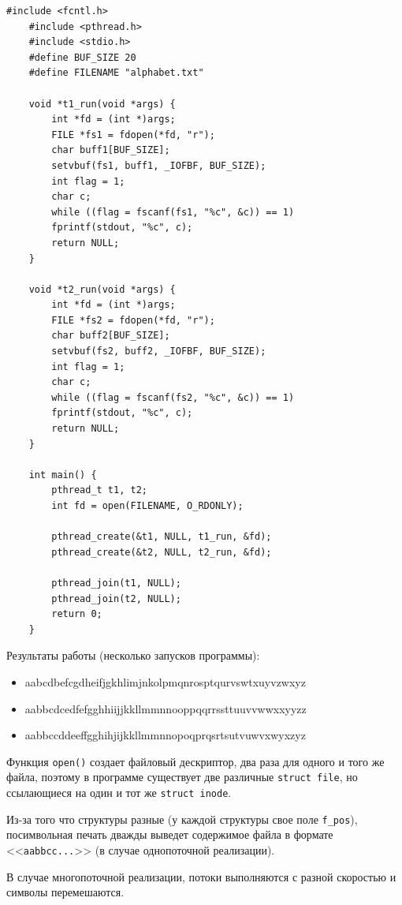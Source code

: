 \begin{lstlisting}[caption={\text{Программа №2 (многопоточная)}}]
	#include <fcntl.h>
	#include <pthread.h>
	#include <stdio.h>
	#define BUF_SIZE 20
	#define FILENAME "alphabet.txt"
	
	void *t1_run(void *args) {
		int *fd = (int *)args;
		FILE *fs1 = fdopen(*fd, "r");
		char buff1[BUF_SIZE];
		setvbuf(fs1, buff1, _IOFBF, BUF_SIZE);
		int flag = 1;
		char c;
		while ((flag = fscanf(fs1, "%c", &c)) == 1)
		fprintf(stdout, "%c", c);
		return NULL;
	}
	
	void *t2_run(void *args) {
		int *fd = (int *)args;
		FILE *fs2 = fdopen(*fd, "r");
		char buff2[BUF_SIZE];
		setvbuf(fs2, buff2, _IOFBF, BUF_SIZE);
		int flag = 1;
		char c;
		while ((flag = fscanf(fs2, "%c", &c)) == 1)
		fprintf(stdout, "%c", c);
		return NULL;
	}
	
	int main() {
		pthread_t t1, t2;
		int fd = open(FILENAME, O_RDONLY);
		
		pthread_create(&t1, NULL, t1_run, &fd);
		pthread_create(&t2, NULL, t2_run, &fd);
		
		pthread_join(t1, NULL);
		pthread_join(t2, NULL);
		return 0;
	}
\end{lstlisting}

Результаты работы (несколько запусков программы): 
\begin{itemize}
	\item aabcdbefcgdheifjgkhlimjnkolpmqnrosptqurvswtxuyvzwxyz
	\item aabbcdcedfefgghhiijjkkllmmnnooppqqrrssttuuvvwwxxyyzz
	\item aabbccddeeffgghihjijkkllmmnnopoqprqsrtsutvuwvxwyxzyz
\end{itemize}


 Функция \texttt{open()} создает файловый дескриптор, два раза для одного и того же файла, поэтому в программе существует две различные \texttt{struct file}, но ссылающиеся на один	и тот же \texttt{struct inode}.
	
	 Из-за того что структуры разные (у каждой структуры свое поле \texttt{f\_pos}), посимвольная печать дважды выведет содержимое файла в формате <<\texttt{aabbcc...}>> (в случае однопоточной реализации).
	
	В случае многопоточной реализации, потоки выполняются с разной скоростью и символы перемешаются.



